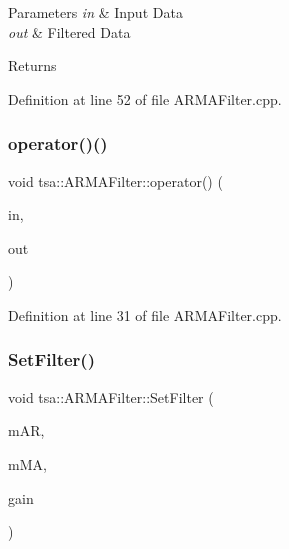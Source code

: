 \begin{DoxyParams}{Parameters}
{\em in} & Input Data \\
\hline
{\em out} & Filtered Data \\
\hline
\end{DoxyParams}
\begin{DoxyReturn}{Returns}

\end{DoxyReturn}


Definition at line 52 of file A\+R\+M\+A\+Filter.\+cpp.

\mbox{\label{classtsa_1_1_a_r_m_a_filter_af5ff08e872b2cbb13221c8e90158c3a3}} 
\subsubsection{\texorpdfstring{operator()()}{operator()()}}
{\footnotesize\ttfamily void tsa\+::\+A\+R\+M\+A\+Filter\+::operator() (\begin{DoxyParamCaption}\item[{\hyperlink{namespacetsa_ac599574bcc094eda25613724b8f3ca9e}{Seq\+View\+Double} \&}]{in,  }\item[{\hyperlink{namespacetsa_ac599574bcc094eda25613724b8f3ca9e}{Seq\+View\+Double} \&}]{out }\end{DoxyParamCaption})}



Definition at line 31 of file A\+R\+M\+A\+Filter.\+cpp.

\mbox{\label{classtsa_1_1_a_r_m_a_filter_a4665d54649f2e971303429dea11a6ae5}} 
\subsubsection{\texorpdfstring{Set\+Filter()}{SetFilter()}}
{\footnotesize\ttfamily void tsa\+::\+A\+R\+M\+A\+Filter\+::\+Set\+Filter (\begin{DoxyParamCaption}\item[{const std\+::vector$<$ double $>$ \&}]{m\+AR,  }\item[{const std\+::vector$<$ double $>$ \&}]{m\+MA,  }\item[{double}]{gain }\end{DoxyParamCaption})}



